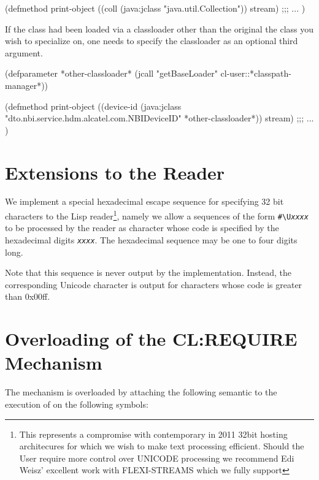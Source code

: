 \documentclass[10pt]{book}
\begin{document}
\begin{listing-lisp}
(defmethod print-object ((coll (java:jclass "java.util.Collection"))
                         stream)
  ;;; ...
)
\end{listing-lisp}

If the class had been loaded via a classloader other than the original
the class you wish to specialize on, one needs to specify the
classloader as an optional third argument.

\begin{listing-lisp}

(defparameter *other-classloader*
  (jcall "getBaseLoader" cl-user::*classpath-manager*))
  
(defmethod print-object
   ((device-id (java:jclass "dto.nbi.service.hdm.alcatel.com.NBIDeviceID" 
                            *other-classloader*))
    stream)
  ;;; ...
)
\end{listing-lisp}

\section{Extensions to the Reader}

We implement a special hexadecimal escape sequence for specifying 32
bit characters to the Lisp reader\footnote{This represents a
  compromise with contemporary in 2011 32bit hosting architecures for
  which we wish to make text processing efficient.  Should the User
  require more control over UNICODE processing we recommend Edi Weisz'
  excellent work with FLEXI-STREAMS which we fully support}, namely we
allow a sequences of the form \verb~#\U~\emph{\texttt{xxxx}} to be processed
by the reader as character whose code is specified by the hexadecimal
digits \emph{\texttt{xxxx}}.  The hexadecimal sequence may be one to four digits
long.  %

Note that this sequence is never output by the implementation.  Instead,
the corresponding Unicode character is output for characters whose
code is greater than 0x00ff.

\section{Overloading of the CL:REQUIRE Mechanism}

The  mechanism is overloaded by attaching the following
semantic to the execution of  on the following symbols:
\end{document}
